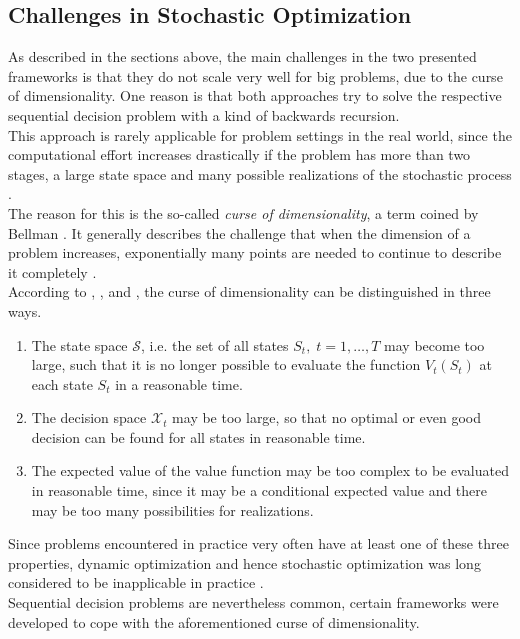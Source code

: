 \subsection{Challenges in Stochastic Optimization} \label{Challenges_stochastic_programming}
As described in the sections above, the main challenges in the two presented frameworks is that they do not scale very well for big problems, due to the curse of dimensionality.
One reason is that both approaches try to solve the respective sequential decision problem with a kind of backwards recursion. \\
This approach is rarely applicable for problem settings in the real world, since the computational effort increases drastically if the problem has more than two stages, a large state space and many possible realizations of the stochastic process \cite{Powell_solving_Curses_of_Dimensionality}. \\
The reason for this is the so-called \textit{curse of dimensionality}, a term coined by Bellman \cite{Bellman1957}.
It generally describes the challenge that when the dimension of a problem increases, exponentially many points are needed to continue to describe it completely \cite{Bellman1957}. \\
According to \cite{Powell_solving_Curses_of_Dimensionality}, \cite{Powell_Perspectives_of_ADP}, and \cite{TwenteBuchKapitel3}, the curse of dimensionality can be distinguished in three ways.
\begin{enumerate}
    \item The state space $\mathcal{S}$, i.e. the set of all states $S_t,\; t=1,\dots,T$ may become too large, such that it is no longer possible to evaluate the function $V_t(S_t)$ at each state $S_t$ in a reasonable time.
    \item The decision space $\mathcal{X}_t$ may be too large, so that no optimal or even good decision can be found for all states in reasonable time.
    \item The expected value of the value function may be too complex to be evaluated in reasonable time, since it may be a conditional expected value and there may be too many possibilities for realizations.
\end{enumerate}
Since problems encountered in practice very often have at least one of these three properties, dynamic optimization and hence stochastic optimization was long considered to be inapplicable in practice \cite{Powell_Clearing_the_Jungle_of_stochastic_Optimization}. \\
Sequential decision problems are nevertheless common, certain frameworks were developed to cope with the aforementioned curse of dimensionality.
